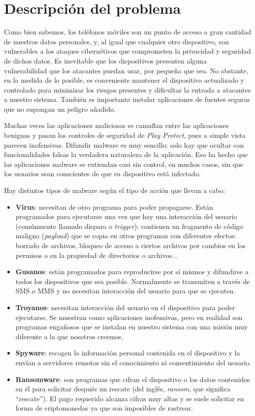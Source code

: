 \chapter{Descripción del problema}
\label{cap2}

Como bien sabemos, los teléfonos móviles son un punto de acceso a gran cantidad de nuestros datos personales, y, al igual que cualquier otro dispositivo, son vulnerables a los ataques cibernéticos que comprometen la privacidad y seguridad de dichos datos. Es inevitable que los dispositivos presenten alguna vulnerabilidad que los atacantes puedan usar, por pequeña que sea. No obstante, en la medida de lo posible, es conveniente mantener el dispositivo actualizado y controlado para minimizar los riesgos presentes y dificultar la entrada a atacantes a nuestro sistema. También es importante instalar aplicaciones de fuentes seguras que no supongan un peligro añadido.

Muchas veces las aplicaciones maliciosas se camuflan entre las aplicaciones benignas y pasan los controles de seguridad de \textit{Play Protect}, pues a simple vista parecen inofensivas. Difundir malware es muy sencillo: solo hay que ocultar con funcionalidades falsas la verdadera naturaleza de la aplicación. Eso ha hecho que las aplicaciones malware se extiendan casi sin control, en muchos casos, sin que los usuarios sean conscientes de que su dispositivo está infectado.

Hay distintos tipos de malware según el tipo de acción que llevan a cabo:

\begin{itemize}
	\item \textbf{Virus}: necesitan de otro programa para poder propagarse. Están programados para ejecutarse una vez que hay una interacción del usuario (comúnmente llamado disparo o \textit{trigger}); contienen un fragmento de código maligno (\textit{payload}) que se copia en otros programas con diferentes efectos: borrado de archivos, bloqueo de acceso a ciertos archivos por cambios en los permisos o en la propiedad de directorios o archivos...
	\item \textbf{Gusanos}: están programados para reproducirse por sí mismos y difundirse a todos los dispositivos que sea posible. Normalmente se transmiten a través de SMS o MMS y no necesitan interacción del usuario para que se ejecuten.
	\item \textbf{Troyanos}: necesitan interacción del usuario en el dispositivo para poder ejecutarse. Se muestran como aplicaciones inofensivas, pero en realidad son programas engañosos que se instalan en nuestro sistema con una misión muy diferente a la que nosotros creemos.
	\item \textbf{Spyware}: recogen la información personal contenida en el dispositivo y la envían a servidores remotos sin el conocimiento ni consentimiento del usuario.
	\item \textbf{Ransomware}: son programas que cifran el dispositivo o los datos contenidos en él para solicitar después un rescate (del inglés, \textit{ransom}, que significa ``rescate''). El pago requerido alcanza cifras muy altas y se suele solicitar en forma de criptomonedas ya que son imposibles de rastrear.
\end{itemize}

